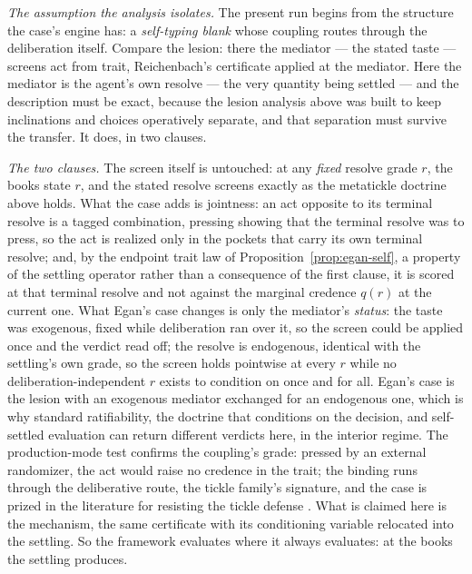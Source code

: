 \textit{The assumption the analysis isolates.} The present run begins from the structure the case's engine has: a \emph{self-typing blank} whose coupling routes through the deliberation itself. Compare the lesion: there the mediator --- the stated taste --- screens act from trait, Reichenbach's certificate applied at the mediator. Here the mediator is the agent's own resolve --- the very quantity being settled --- and the description must be exact, because the lesion analysis above was built to keep inclinations and choices operatively separate, and that separation must survive the transfer. It does, in two clauses.

\textit{The two clauses.} The screen itself is untouched: at any \emph{fixed} resolve grade $r$, the books state $r$, and the stated resolve screens exactly as the metatickle doctrine above holds. What the case adds is jointness: an act opposite to its terminal resolve is a tagged combination, pressing showing that the terminal resolve was to press, so the act is realized only in the pockets that carry its own terminal resolve; and, by the endpoint trait law of Proposition~\ref{prop:egan-self}, a property of the settling operator rather than a consequence of the first clause, it is scored at that terminal resolve and not against the marginal credence $q(r)$ at the current one. What Egan's case changes is only the mediator's \emph{status}: the taste was exogenous, fixed while deliberation ran over it, so the screen could be applied once and the verdict read off; the resolve is endogenous, identical with the settling's own grade, so the screen holds pointwise at every $r$ while no deliberation-independent $r$ exists to condition on once and for all. Egan's case is the lesion with an exogenous mediator exchanged for an endogenous one, which is why standard ratifiability, the doctrine that conditions on the decision, and self-settled evaluation can return different verdicts here, in the interior regime. The production-mode test confirms the coupling's grade: pressed by an external randomizer, the act would raise no credence in the trait; the binding runs through the deliberative route, the tickle family's signature, and the case is prized in the literature for resisting the tickle defense \cite{egan2007some}. What is claimed here is the mechanism, the same certificate with its conditioning variable relocated into the settling. So the framework evaluates where it always evaluates: at the books the settling produces.

